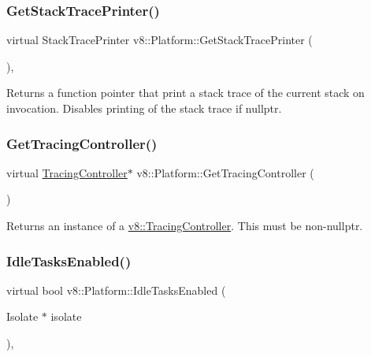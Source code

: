 \subsubsection{\texorpdfstring{Get\+Stack\+Trace\+Printer()}{GetStackTracePrinter()}}
{\footnotesize\ttfamily virtual Stack\+Trace\+Printer v8\+::\+Platform\+::\+Get\+Stack\+Trace\+Printer (\begin{DoxyParamCaption}{ }\end{DoxyParamCaption})\hspace{0.3cm}{\ttfamily [inline]}, {\ttfamily [virtual]}}

Returns a function pointer that print a stack trace of the current stack on invocation. Disables printing of the stack trace if nullptr. \mbox{\label{classv8_1_1Platform_aa760c7bf8c46495eb650d2be72399747}} 
\subsubsection{\texorpdfstring{Get\+Tracing\+Controller()}{GetTracingController()}}
{\footnotesize\ttfamily virtual \mbox{\hyperlink{classv8_1_1TracingController}{Tracing\+Controller}}$\ast$ v8\+::\+Platform\+::\+Get\+Tracing\+Controller (\begin{DoxyParamCaption}{ }\end{DoxyParamCaption})\hspace{0.3cm}{\ttfamily [pure virtual]}}

Returns an instance of a \mbox{\hyperlink{classv8_1_1TracingController}{v8\+::\+Tracing\+Controller}}. This must be non-\/nullptr. \mbox{\label{classv8_1_1Platform_ad229642bf16a066d2e8d866dc128141e}} 
\subsubsection{\texorpdfstring{Idle\+Tasks\+Enabled()}{IdleTasksEnabled()}}
{\footnotesize\ttfamily virtual bool v8\+::\+Platform\+::\+Idle\+Tasks\+Enabled (\begin{DoxyParamCaption}\item[{Isolate $\ast$}]{isolate }\end{DoxyParamCaption})\hspace{0.3cm}{\ttfamily [inline]}, {\ttfamily [virtual]}}

